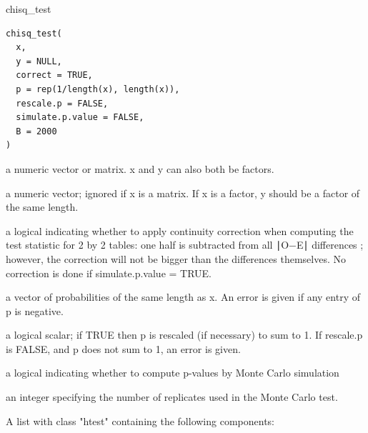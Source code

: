 \documentclass[a4paper]{book}
\begin{document}
%
\begin{Description}
chisq\_test
\end{Description}
%
\begin{Usage}
\begin{verbatim}
chisq_test(
  x,
  y = NULL,
  correct = TRUE,
  p = rep(1/length(x), length(x)),
  rescale.p = FALSE,
  simulate.p.value = FALSE,
  B = 2000
)
\end{verbatim}
\end{Usage}
%
\begin{Arguments}
\begin{ldescription}
\item[\code{x}] a numeric vector or matrix. x and y can also both be factors.

\item[\code{y}] a numeric vector; ignored if x is a matrix. If x is a factor,
y should be a factor of the same length.

\item[\code{correct}] a logical indicating whether to apply continuity correction when computing
the test statistic for 2 by 2 tables: one half is subtracted from all ∣O−E∣ differences
; however, the correction will not be bigger than the differences themselves.
No correction is done if simulate.p.value = TRUE.

\item[\code{p}] a vector of probabilities of the same length as x.
An error is given if any entry of p is negative.

\item[\code{rescale.p}] a logical scalar; if TRUE then p is rescaled (if necessary) to sum to 1.
If rescale.p is FALSE, and p does not sum to 1, an error is given.

\item[\code{simulate.p.value}] a logical indicating whether to compute p-values by Monte Carlo simulation

\item[\code{B}] an integer specifying the number of replicates used in the Monte Carlo test.
\end{ldescription}
\end{Arguments}
%
\begin{Value}
A list with class "htest" containing the following components:
\end{Value}
%
\end{document}
